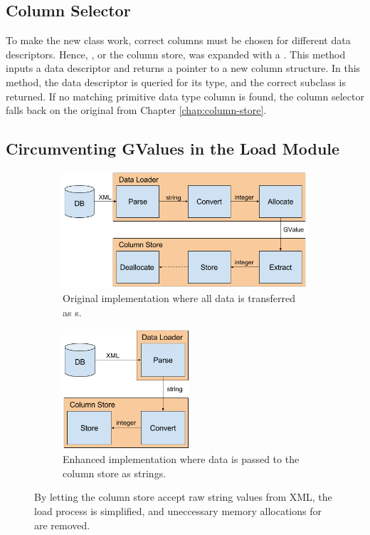 \subsection{Column Selector}
\label{sub:Column Selector}
To make the new  class work, correct columns must be chosen for different data descriptors. Hence, , or the column store, was expanded with a . This method inputs a data descriptor and returns a pointer to a new column structure. In this method, the data descriptor is queried for its type, and the correct  subclass is returned. If no matching primitive data type column is found, the column selector falls back on the original  from Chapter \ref{chap:column-store}.

\subsection{Circumventing GValues in the Load Module}
\label{sub:Circumventing GValues in the Load Module}
\begin{figure}
    \centering
    \begin{subfigure}{\textwidth}
        \centering
        \includegraphics[width=\textwidth]{img/gap-load-original.png}
        \caption{Original implementation where all data is transferred as s.}
    \end{subfigure}
    \begin{subfigure}{\textwidth}
        \centering
        \includegraphics[width=0.52\textwidth]{img/gap-load-raw.png}
        \caption{Enhanced implementation where data is passed to the column store as strings.}
    \end{subfigure}
\caption{By letting the column store accept raw string values from XML, the load process is simplified, and uneccessary memory allocations for  are removed.}
\label{fig:gap-load-raw}
\end{figure}

